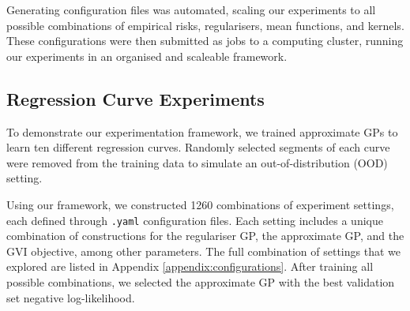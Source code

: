 \documentclass{article}
\def\code#1{\texttt{#1}}
\numberwithin{equation}{section}
\begin{document}
Generating configuration files was automated, scaling our experiments to all possible combinations of empirical risks, regularisers, mean functions, and kernels. 
These configurations were then submitted as jobs to a computing cluster, running our experiments in an organised and scaleable framework.

\subsection{Regression Curve Experiments}
To demonstrate our experimentation framework, we trained approximate GPs to learn ten different regression curves. 
Randomly selected segments of each curve were removed from the training data to simulate an out-of-distribution (OOD) setting.

Using our framework, we constructed 1260 combinations of experiment settings, each defined through \code{.yaml} configuration files. 
Each setting includes a unique combination of constructions for the regulariser GP, the approximate GP, and the GVI objective, among other parameters. 
The full combination of settings that we explored are listed in Appendix \ref{appendix:configurations}.
After training all possible combinations, we selected the approximate GP with the best validation set negative log-likelihood. 
\end{document}
